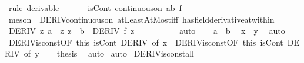\begin{isabellebody}
\ {\isacharparenleft}{\kern0pt}rule\ derivable{\isacharparenright}{\kern0pt}\isanewline
\ \ \isamarkupfalse%
\isanewline
\ \ \isamarkupfalse%
\ isCont{\isacharcolon}{\kern0pt}\ {\isachardoublequoteopen}continuous{\isacharunderscore}{\kern0pt}on\ {\isacharbraceleft}{\kern0pt}{\isacharquery}{\kern0pt}a{\isachardot}{\kern0pt}{\isachardot}{\kern0pt}{\isacharquery}{\kern0pt}b{\isacharbraceright}{\kern0pt}\ f{\isachardoublequoteclose}\isanewline
\ \ \ \ \isamarkupfalse%
\ {\isacharparenleft}{\kern0pt}meson\ {\isacharasterisk}{\kern0pt}\ DERIV{\isacharunderscore}{\kern0pt}continuous{\isacharunderscore}{\kern0pt}on\ atLeastAtMost{\isacharunderscore}{\kern0pt}iff\ has{\isacharunderscore}{\kern0pt}field{\isacharunderscore}{\kern0pt}derivative{\isacharunderscore}{\kern0pt}at{\isacharunderscore}{\kern0pt}within{\isacharparenright}{\kern0pt}\isanewline
\ \ \isamarkupfalse%
\ DERIV{\isacharcolon}{\kern0pt}\ {\isachardoublequoteopen}{\isasymAnd}z{\isachardot}{\kern0pt}\ {\isasymlbrakk}{\isacharquery}{\kern0pt}a\ {\isacharless}{\kern0pt}\ z{\isacharsemicolon}{\kern0pt}\ z\ {\isacharless}{\kern0pt}\ {\isacharquery}{\kern0pt}b{\isasymrbrakk}\ {\isasymLongrightarrow}\ DERIV\ f\ z\ {\isacharcolon}{\kern0pt}{\isachargreater}{\kern0pt}\ {}{\isachardoublequoteclose}\isanewline
\ \ \ \ \isamarkupfalse%
\ {\isacharasterisk}{\kern0pt}\ \isamarkupfalse%
\ auto\isanewline
\ \ \isamarkupfalse%
\ {\isachardoublequoteopen}{\isacharquery}{\kern0pt}a\ {\isacharless}{\kern0pt}\ {\isacharquery}{\kern0pt}b{\isachardoublequoteclose}\ \isamarkupfalse%
\ {\isacartoucheopen}x\ {\isasymnoteq}\ y{\isacartoucheclose}\ \isamarkupfalse%
\ auto\isanewline
\ \ \isamarkupfalse%
\ DERIV{\isacharunderscore}{\kern0pt}isconst{}{\isacharbrackleft}{\kern0pt}OF\ this\ isCont\ DERIV{\isacharcomma}{\kern0pt}\ of\ x{\isacharbrackright}{\kern0pt}\ \ DERIV{\isacharunderscore}{\kern0pt}isconst{}{\isacharbrackleft}{\kern0pt}OF\ this\ isCont\ DERIV{\isacharcomma}{\kern0pt}\ of\ y{\isacharbrackright}{\kern0pt}\isanewline
\ \ \isamarkupfalse%
\ {\isacharquery}{\kern0pt}thesis\ \isamarkupfalse%
\ auto\isanewline
{}\isamarkupfalse%
\ auto%
\endisatagproof
{\isafoldproof}%
%
\isadelimproof
\isanewline
%
\endisadelimproof
\isanewline
{}\isamarkupfalse%
\ DERIV{\isacharunderscore}{\kern0pt}isconst{\isacharunderscore}{\kern0pt}all{\isacharcolon}{\kern0pt}\isanewline

\end{isabellebody}
